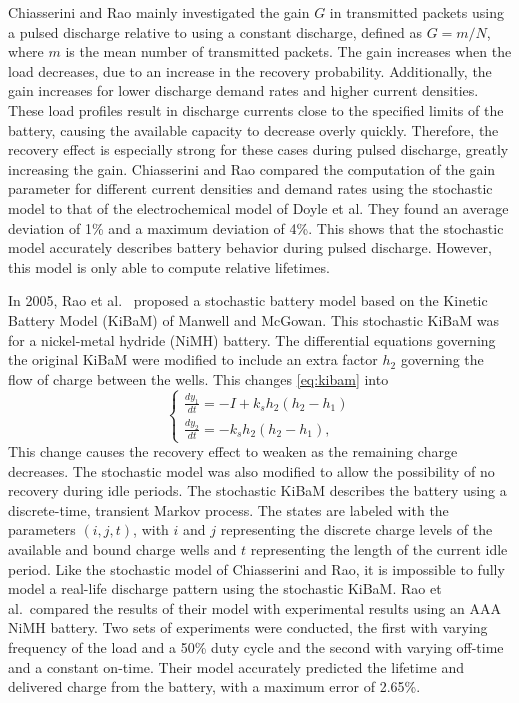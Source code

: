 \documentclass[../zhang_thesis.tex]{subfiles}
\begin{document}
Chiasserini and Rao mainly investigated the gain $G$ in transmitted packets using a pulsed discharge relative to using a constant discharge, defined as $G=m/N$, where $m$ is the mean number of transmitted packets. The gain increases when the load decreases, due to an increase in the recovery probability. Additionally, the gain increases for lower discharge demand rates and higher current densities. These load profiles result in discharge currents close to the specified limits of the battery, causing the
available capacity to decrease overly quickly. Therefore, the recovery effect is especially strong for these cases during pulsed discharge, greatly increasing the gain. Chiasserini and Rao compared the computation of the gain parameter for different current densities and demand rates using the stochastic model to that of the electrochemical model of Doyle et al. They found an average deviation of 1\% and a maximum deviation of 4\%. This shows that the stochastic model accurately describes battery behavior during pulsed discharge. However, this model is only able to compute relative lifetimes.

In 2005, Rao et al.~\cite{rao05} proposed a stochastic battery model based on the Kinetic Battery Model (KiBaM) of Manwell and McGowan. This stochastic KiBaM was for a nickel-metal hydride (NiMH) battery. The differential equations governing the original KiBaM were modified to include an extra factor $h_2$ governing the flow of charge between the wells. This changes \autoref{eq:kibam} into
\begin{equation}
    \begin{cases}
        \frac{dy_1}{dt} = -I + k_s h_2 \left( h_2 - h_1 \right) \\
        \frac{dy_2}{dt} = -k_s h_2 \left( h_2 - h_1 \right),
    \end{cases}
\end{equation}
This change causes the recovery effect to weaken as the remaining charge decreases. The stochastic model was also modified to allow the possibility of no recovery during idle periods. The stochastic KiBaM describes the battery using a discrete-time, transient Markov process. The states are labeled with the parameters $(i,j,t)$, with $i$ and $j$ representing the discrete charge levels of the available and bound charge wells and $t$ representing the length of the current idle period.
Like the stochastic model of Chiasserini and Rao, it is impossible to fully model a real-life discharge pattern using the stochastic KiBaM. Rao et al.\ compared the results of their model with experimental results using an AAA NiMH battery. Two sets of experiments were conducted, the first with varying frequency of the load and a 50\% duty cycle and the second with varying off-time and a constant on-time. Their model accurately predicted the lifetime and delivered charge from the
battery, with a maximum error of 2.65\%.
\end{document}
